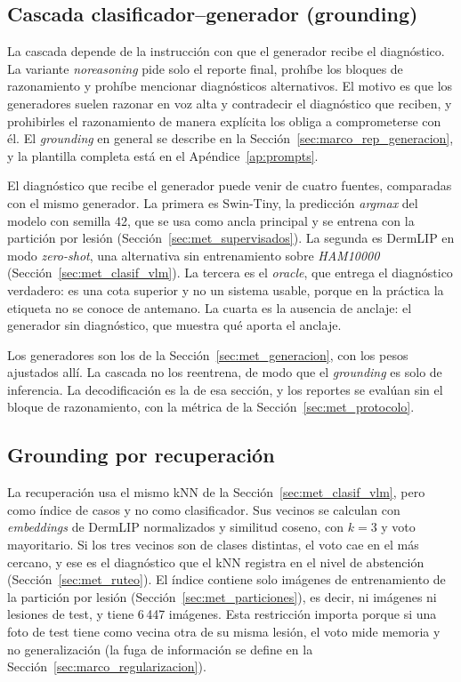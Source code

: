 \subsection{Cascada clasificador--generador (grounding)}
\label{sec:met_cascada}

La cascada depende de la instrucción con que el generador recibe el diagnóstico. La variante \emph{noreasoning} pide
solo el reporte final, prohíbe los bloques de razonamiento y prohíbe mencionar diagnósticos alternativos. El motivo es
que los generadores suelen razonar en voz alta y contradecir el diagnóstico que reciben, y prohibirles el razonamiento
de manera explícita los obliga a comprometerse con él. El \emph{grounding} en general se describe en la
Sección~\ref{sec:marco_rep_generacion}, y la plantilla completa está en el Apéndice~\ref{ap:prompts}.

El diagnóstico que recibe el generador puede venir de cuatro fuentes, comparadas con el mismo generador. La primera es
Swin-Tiny, la predicción \emph{argmax} del modelo con semilla 42, que se usa como ancla principal y se entrena con la
partición por lesión (Sección~\ref{sec:met_supervisados}). La segunda es DermLIP en modo \emph{zero-shot}, una
alternativa sin entrenamiento sobre \emph{HAM10000} (Sección~\ref{sec:met_clasif_vlm}). La tercera es el \emph{oracle},
que entrega el diagnóstico verdadero: es una cota superior y no un sistema usable, porque en la práctica la etiqueta no
se conoce de antemano. La cuarta es la ausencia de anclaje: el generador sin diagnóstico, que muestra qué aporta el anclaje.

Los generadores son los de la Sección~\ref{sec:met_generacion}, con los pesos ajustados allí. La cascada no los
reentrena, de modo que el \emph{grounding} es solo de inferencia. La decodificación es la de esa sección, y los
reportes se evalúan sin el bloque de razonamiento, con la métrica de la Sección~\ref{sec:met_protocolo}.

\subsection{Grounding por recuperación}
\label{sec:met_recuperacion}

La recuperación usa el mismo kNN de la Sección~\ref{sec:met_clasif_vlm}, pero como índice de casos y no como
clasificador. Sus vecinos se calculan con \emph{embeddings} de DermLIP normalizados y similitud coseno, con $k = 3$ y
voto mayoritario. Si los tres vecinos son de clases distintas, el voto cae en el más cercano, y ese es el diagnóstico que el kNN
registra en el nivel de abstención (Sección~\ref{sec:met_ruteo}). El índice contiene solo imágenes de entrenamiento de la
partición por lesión (Sección~\ref{sec:met_particiones}), es decir, ni imágenes ni lesiones de test, y tiene 6\,447
imágenes. Esta restricción importa porque si una foto de test tiene como vecina otra de su misma lesión, el voto mide
memoria y no generalización (la fuga de información se define en la Sección~\ref{sec:marco_regularizacion}).

